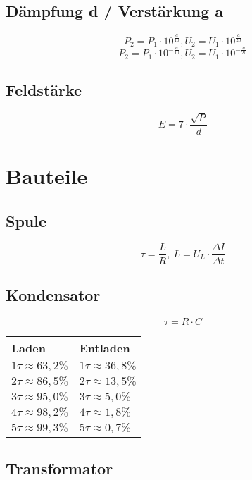 \documentclass[10pt,landscape]{scrartcl}
\begin{document}
\begin{multicols}{3}
\subsection*{Dämpfung d / Verstärkung a}

$$ P_2 = P_1 \cdot 10^\frac{a}{10}, U_2 = U_1 \cdot 10^\frac{a}{20} $$
$$ P_2 = P_1 \cdot 10^{-\frac{a}{10}}, U_2 = U_1 \cdot 10^{-\frac{a}{20}} $$

\subsection*{Feldstärke}

$$ E = 7 \cdot \frac{\sqrt{P}}{d} $$

\section{Bauteile}

\subsection*{Spule}

$$ \tau = \frac{L}{R},\ L = U_L \cdot \frac{\Delta I}{\Delta t} $$

\noindent
{}

\subsection*{Kondensator}

$$\tau = R\cdot C $$

\begin{center}
\begin{tabular}{|ll|}
\hline
Laden                   & Entladen \\
\hline
$1 \tau \approx 63,2\%$	& $1 \tau \approx 36,8\%$ \\
$2 \tau \approx 86,5\%$	& $2 \tau \approx 13,5\%$ \\
$3 \tau \approx 95,0\%$	& $3 \tau \approx 5,0\% $ \\
$4 \tau \approx 98,2\%$	& $4 \tau \approx 1,8\% $ \\
$5 \tau \approx 99,3\%$	& $5 \tau \approx 0,7\% $ \\
\hline
\end{tabular}
\end{center}

\subsection*{Transformator}


\end{multicols}
\end{document}
